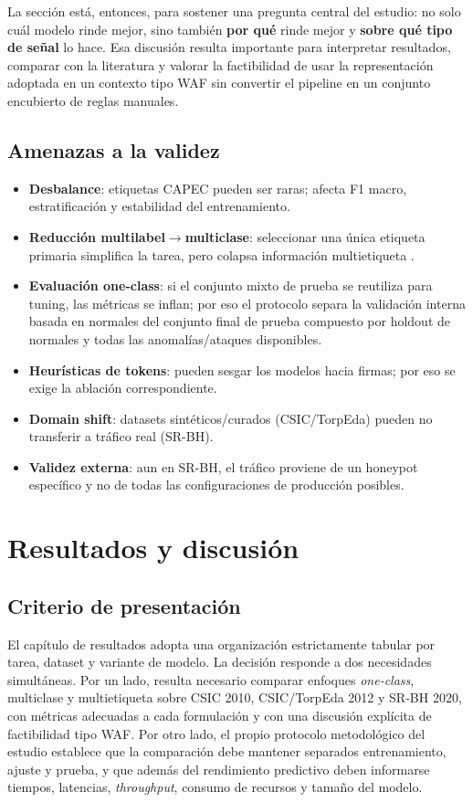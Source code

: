 \documentclass[12pt,oneside]{report}
\begin{document}
La sección está, entonces, para sostener una pregunta central del estudio: no solo cuál modelo rinde mejor, sino también \textbf{por qué} rinde mejor y \textbf{sobre qué tipo de señal} lo hace. Esa discusión resulta importante para interpretar resultados, comparar con la literatura y valorar la factibilidad de usar la representación adoptada en un contexto tipo WAF sin convertir el pipeline en un conjunto encubierto de reglas manuales.

\section{Amenazas a la validez}
\begin{itemize}[leftmargin=*]
  \item \textbf{Desbalance}: etiquetas CAPEC pueden ser raras; afecta F1 macro, estratificación y estabilidad del entrenamiento.
  \item \textbf{Reducción multilabel$\rightarrow$multiclase}: seleccionar una única etiqueta primaria simplifica la tarea, pero colapsa información multietiqueta \cite{capec_schema_docs,capec_schema_desc,owasp_risk_rating}.
  \item \textbf{Evaluación one-class}: si el conjunto mixto de prueba se reutiliza para tuning, las métricas se inflan; por eso el protocolo separa la validación interna basada en normales del conjunto final de prueba compuesto por holdout de normales y todas las anomalías/ataques disponibles.
  \item \textbf{Heurísticas de tokens}: pueden sesgar los modelos hacia firmas; por eso se exige la ablación correspondiente.
  \item \textbf{Domain shift}: datasets sintéticos/curados (CSIC/TorpEda) pueden no transferir a tráfico real (SR-BH).
  \item \textbf{Validez externa}: aun en SR-BH, el tráfico proviene de un honeypot específico y no de todas las configuraciones de producción posibles.
\end{itemize}

\chapter{Resultados y discusión}

\section{Criterio de presentación}
El capítulo de resultados adopta una organización estrictamente tabular por tarea, dataset y variante de modelo. La decisión responde a dos necesidades simultáneas. Por un lado, resulta necesario comparar enfoques \textit{one-class}, multiclase y multietiqueta sobre CSIC 2010, CSIC/TorpEda 2012 y SR-BH 2020, con métricas adecuadas a cada formulación y con una discusión explícita de factibilidad tipo WAF. Por otro lado, el propio protocolo metodológico del estudio establece que la comparación debe mantener separados entrenamiento, ajuste y prueba, y que además del rendimiento predictivo deben informarse tiempos, latencias, \textit{throughput}, consumo de recursos y tamaño del modelo.\
\end{document}
